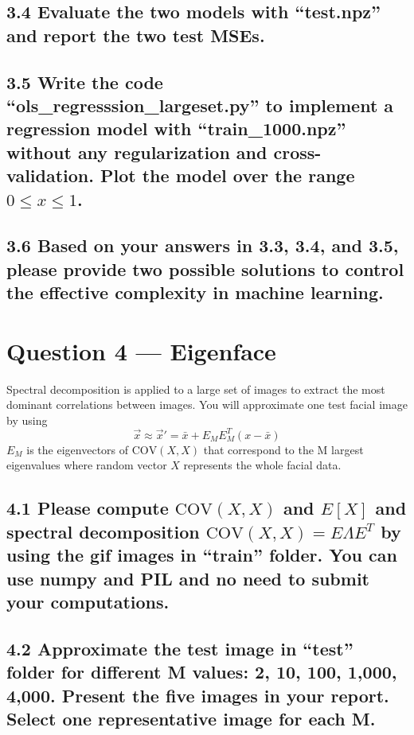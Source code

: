 \documentclass[12pt]{article}
\begin{document}
\subsection*{3.4
Evaluate the two models with “test.npz” and report the two test MSEs.}

\subsection*{3.5
Write the code “ols\_regresssion\_largeset.py” to implement a regression model with “train\_1000.npz” without any regularization and cross-validation. Plot the model over the range $0 \le x \le 1$.}

\subsection*{3.6
Based on your answers in 3.3, 3.4, and 3.5, please provide two possible solutions to control the effective complexity in machine learning.}

\newpage
\section*{Question 4 — Eigenface}

Spectral decomposition is applied to a large set of images to extract the most dominant correlations between images. You will approximate one test facial image by using
\[
\vec{x} \approx \vec{x}' = \bar{x} + E_M E_M^T (x - \bar{x})
\]
$E_M$ is the eigenvectors of $\text{COV}(X,X)$ that correspond to the M largest eigenvalues where random vector $X$ represents the whole facial data.

\subsection*{4.1
Please compute $\text{COV}(X,X)$ and $E[X]$ and spectral decomposition $\text{COV}(X,X) = E\Lambda E^T$ by using the gif images in “train” folder. You can use numpy and PIL and no need to submit your computations.}

\subsection*{4.2
Approximate the test image in “test” folder for different M values: 2, 10, 100, 1,000, 4,000. Present the five images in your report. Select one representative image for each M.}
\end{document}
